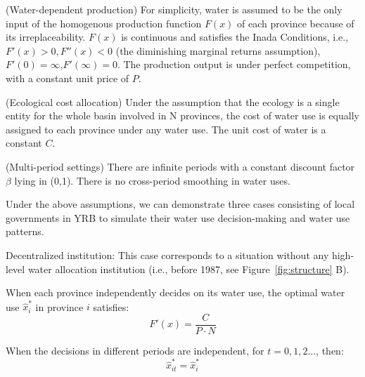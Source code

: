 \documentclass{../nsr}
\begin{document}
\begin{ass}
    (Water-dependent production) For simplicity, water is assumed to be the only input of the homogenous production function $F(x)$ of each province because of its irreplaceability. $F(x)$ is continuous and satisfies the Inada Conditions, i.e., $F'(x)>0, F''(x)<0$ (the diminishing marginal returns assumption), $F'(0)=\infty$,$ F'(\infty)=0$. The production output is under perfect competition, with a constant unit price of $P$.
\end{ass}
\begin{ass}
    (Ecological cost allocation) Under the assumption that the ecology is a single entity for the whole basin involved in N provinces, the cost of water use is equally assigned to each province under any water use. The unit cost of water is a constant $C$.
\end{ass}
\begin{ass}
    (Multi-period settings) There are infinite periods with a constant discount factor $\beta$ lying in (0,1). There is no cross-period smoothing in water uses.
\end{ass}

Under the above assumptions, we can demonstrate three cases consisting of local governments in YRB to simulate their water use decision-making and water use patterns.

\begin{case} Decentralized institution:
    This case corresponds to a situation without any high-level water allocation institution (i.e., before 1987, see Figure~\ref{fig:structure} B).

    When each province independently decides on its water use, the optimal water use $\hat x_i^*$ in province $i$ satisfies:
    $$F'(x)=\frac{C}{P \cdot N}$$

    When the decisions in different periods are independent, for $t=0,1,2 \ldots$, then:
    $$\hat x_{it}^*=\hat x_i^*$$

\end{case}
\end{document}
